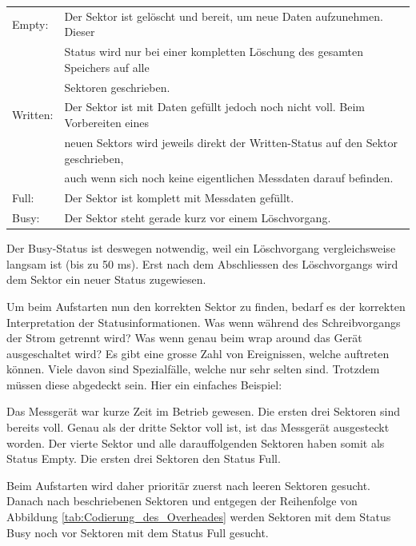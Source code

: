 \begin{table}[H]
\begin{tabular}{ll}
Empty:			&   Der Sektor ist gelöscht und bereit, um neue Daten 								aufzunehmen. Dieser \\
				&   Status wird nur bei einer 														kompletten Löschung des gesamten Speichers auf alle \\
				&	Sektoren geschrieben.\\
Written:		&   Der Sektor ist mit Daten gefüllt jedoch noch nicht 						voll. Beim Vorbereiten eines \\
				&   neuen Sektors wird 	jeweils direkt der Written-Status 							auf den Sektor geschrieben,\\
				&   auch wenn sich noch keine eigentlichen 										Messdaten darauf befinden.\\
Full:			&   Der Sektor ist komplett mit Messdaten gefüllt.\\
Busy:			&   Der Sektor steht gerade kurz vor einem Löschvorgang.\\
\end{tabular}
\end{table}

Der Busy-Status ist deswegen notwendig, weil ein Löschvorgang vergleichsweise langsam ist (bis zu 50 ms). Erst nach dem Abschliessen des Löschvorgangs wird dem Sektor ein neuer Status zugewiesen.

Um beim Aufstarten nun den korrekten Sektor zu finden, bedarf es der korrekten Interpretation der Statusinformationen. Was wenn während des Schreibvorgangs der Strom getrennt wird? Was wenn genau beim \glqq wrap around\grqq{}   das Gerät ausgeschaltet wird? Es gibt eine grosse Zahl von Ereignissen, welche auftreten können. Viele davon sind Spezialfälle, welche nur sehr selten sind. Trotzdem müssen diese abgedeckt sein. Hier ein einfaches Beispiel:

Das Messgerät war kurze Zeit im Betrieb gewesen. Die ersten drei Sektoren sind bereits voll. Genau als der dritte Sektor voll ist, ist das Messgerät ausgesteckt worden. Der vierte Sektor und alle darauffolgenden Sektoren haben somit als Status \glqq Empty\grqq . Die ersten drei Sektoren den Status  \glqq Full\grqq .

Beim Aufstarten wird daher prioritär zuerst nach leeren Sektoren gesucht. Danach nach beschriebenen Sektoren und entgegen der Reihenfolge von Abbildung \ref{tab:Codierung_des_Overheades} werden Sektoren mit dem Status \glqq Busy\grqq{}  noch vor Sektoren mit dem Status \glqq Full\grqq{}  gesucht.

